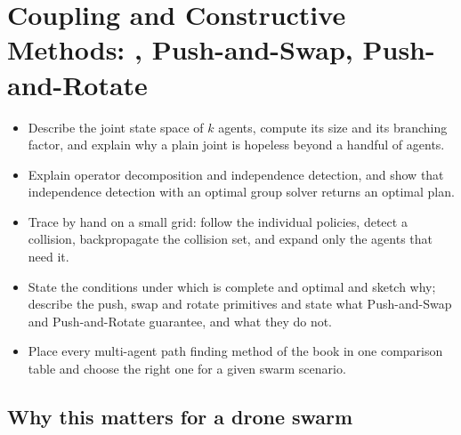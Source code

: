 \chapter[\mstar, Push-and-Swap, Push-and-Rotate]{Coupling and Constructive Methods: \mstar, Push-and-Swap, Push-and-Rotate}
\label{ch:ch11}

\begin{objectives}
\begin{itemize}
  \item Describe the joint state space of $k$ agents, compute its size and its branching factor, and explain why a plain joint \astar is hopeless beyond a handful of agents.
  \item Explain operator decomposition and independence detection, and show that independence detection with an optimal group solver returns an optimal plan.
  \item Trace \mstar by hand on a small grid: follow the individual policies, detect a collision, backpropagate the collision set, and expand only the agents that need it.
  \item State the conditions under which \mstar is complete and optimal and sketch why; describe the push, swap and rotate primitives and state what Push-and-Swap and Push-and-Rotate guarantee, and what they do not.
  \item Place every multi-agent path finding method of the book in one comparison table and choose the right one for a given swarm scenario.
\end{itemize}
\end{objectives}

\section{Why this matters for a drone swarm}
\label{sec:ch11-motivation}

